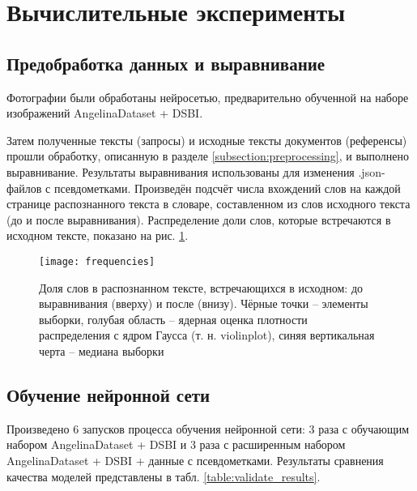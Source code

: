 \documentclass{main.tex}[subfiles]
\begin{document}
\newpage
\section{Вычислительные эксперименты}
\subsection{Предобработка данных и выравнивание}

Фотографии были обработаны нейросетью, предварительно обученной на наборе изображений AngelinaDataset + DSBI.

Затем полученные тексты (запросы) и исходные тексты документов (референсы) прошли обработку, описанную в разделе \ref{subsection:preprocessing}, и выполнено выравнивание.
Результаты выравнивания использованы для изменения .json-файлов с псевдометками.
Произведён подсчёт числа вхождений слов на каждой странице распознанного текста в словаре, составленном из слов исходного текста (до и после выравнивания).
Распределение доли слов, которые встречаются в исходном тексте, показано на рис. \ref{fig:frequencies}.

\begin{figure}[H]
    \centering
    \texttt{[image: frequencies]}
    \caption{Доля слов в распознанном тексте, встречающихся в исходном: до выравнивания (вверху) и после (внизу). Чёрные точки -- элементы выборки, голубая область -- ядерная оценка плотности распределения с ядром Гаусса (т. н. violinplot), синяя вертикальная черта -- медиана выборки}
    \label{fig:frequencies}
\end{figure}

\subsection{Обучение нейронной сети}

Произведено 6 запусков процесса обучения нейронной сети: 3 раза с обучающим набором AngelinaDataset + DSBI и 3 раза с расширенным набором AngelinaDataset + DSBI + данные с псевдометками.
Результаты сравнения качества моделей представлены в табл. \ref{table:validate_results}.
\end{document}

